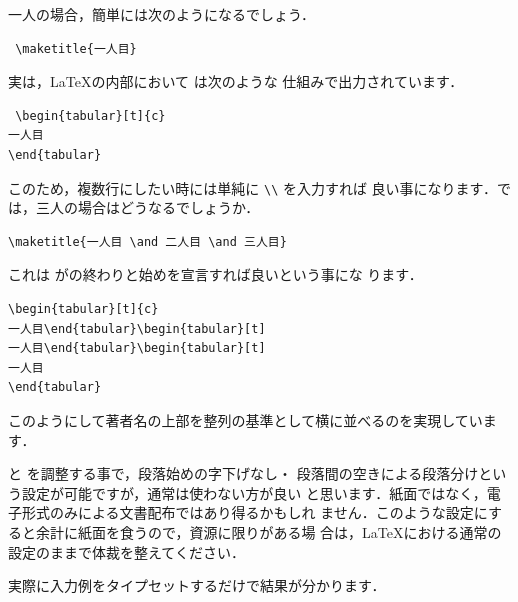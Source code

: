 \begin{description}
一人の場合，簡単には次のようになるでしょう．
\begin{verbatim}
 \maketitle{一人目}
\end{verbatim}
実は，\LaTeX の内部において  は次のような
仕組みで出力されています．
\begin{verbatim}
 \begin{tabular}[t]{c}
一人目
\end{tabular}
\end{verbatim}
このため，複数行にしたい時には単純に \verb|\\| を入力すれば
良い事になります．では，三人の場合はどうなるでしょうか．
\begin{verbatim}
\maketitle{一人目 \and 二人目 \and 三人目}
\end{verbatim}
これは  がの終わりと始めを宣言すれば良いという事にな
ります．
\begin{verbatim}
\begin{tabular}[t]{c}
一人目\end{tabular}\begin{tabular}[t] 
一人目\end{tabular}\begin{tabular}[t] 
一人目
\end{tabular}
\end{verbatim}
このようにして著者名の上部を整列の基準として横に並べるのを実現しています．

 と  を調整する事で，段落始めの字下げなし・
段落間の空きによる段落分けという設定が可能ですが，通常は使わない方が良い
と思います．紙面ではなく，電子形式のみによる文書配布ではあり得るかもしれ
ません．このような設定にすると余計に紙面を食うので，資源に限りがある場
合は，\LaTeX における通常の設定のままで体裁を整えてください．

実際に入力例をタイプセットするだけで結果が分かります．
\end{description}



